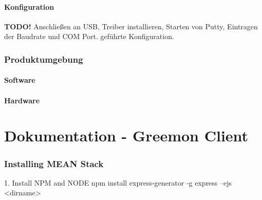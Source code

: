 \documentclass[pointlessnumbers]{scrartcl}
\begin{document}
    \subsection{Konfiguration}
    \textbf{TODO!}
    Anschließen an USB, Treiber installieren, Starten von Putty, Eintragen der Baudrate und COM Port. geführte Konfiguration.

\section{Produktumgebung}
\subsection{Software}
%
%
\subsection{Hardware}
%
%






\newpage
\part{Dokumentation - Greemon Client}
\section{Installing MEAN Stack}
    1. Install NPM and NODE
    npm install express-generator -g
    express --ejs <dirname>
\end{document}
